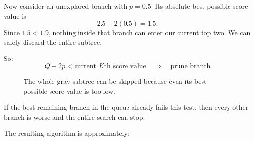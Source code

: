 Now consider an unexplored branch with $p=0.5$. Its absolute best possible score value is
\[
2.5-2(0.5)=1.5.
\]
Since $1.5<1.9$, nothing inside that branch can enter our current top two. We can safely
discard the entire subtree.

So:
\[
\boxed{Q-2p<\text{current }K\text{th score value}\quad\Rightarrow\quad\text{prune branch}}
\]

\begin{figure}[H]\centering
{}
\caption{The whole gray subtree can be skipped because even its best possible score value is too low.}
\end{figure}

If the best remaining branch in the queue already fails this test, then every other branch
is worse and the entire search can stop.

The resulting algorithm is approximately:

